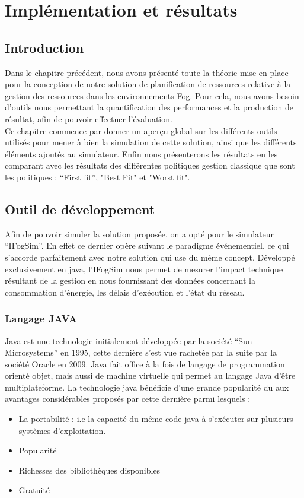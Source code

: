 \chapter{Implémentation et résultats}
\section{Introduction}
Dans le chapitre précédent, nous avons présenté toute la théorie mise en place pour la conception de notre solution de planification de ressources relative à la gestion des ressources dans les environnements Fog. Pour cela, nous avons besoin d'outils nous permettant la quantification des performances et la production de résultat, afin de pouvoir effectuer l'évaluation.\\
Ce chapitre commence par donner un aperçu global sur les différents outils utilisés pour mener à bien la simulation de cette solution, ainsi que les différents éléments ajoutés au simulateur. Enfin nous présenterons les résultats en les comparant avec les résultats des différentes politiques gestion classique que sont les politiques : “First fit”, "Best Fit" et "Worst fit".\\
\section{Outil de développement}
Afin de pouvoir simuler la solution proposée, on a opté pour le simulateur “IFogSim”. En effet ce dernier opère suivant le paradigme événementiel, ce qui s’accorde parfaitement avec notre solution qui use du même concept. Développé exclusivement en java, l’IFogSim nous permet de mesurer l'impact technique résultant de la gestion en nous fournissant des données concernant la consommation d'énergie, les délais d'exécution et l’état du réseau.
\subsection{Langage JAVA}
Java est une technologie initialement développée par la société “Sun Microsystems” en 1995, cette dernière s'est vue rachetée par la suite par la société Oracle en 2009. Java fait office à la fois de langage de programmation orienté objet, mais aussi de machine virtuelle qui permet au langage Java d'être multiplateforme. La technologie java bénéficie d’une grande popularité du aux avantages considérables proposés par cette dernière parmi lesquels :
\begin{itemize}
    \item La portabilité : i.e la capacité du même code java à s'exécuter sur plusieurs systèmes d’exploitation.
    \item Popularité
    \item Richesses des bibliothèques disponibles
    \item Gratuité 
\end{itemize}
